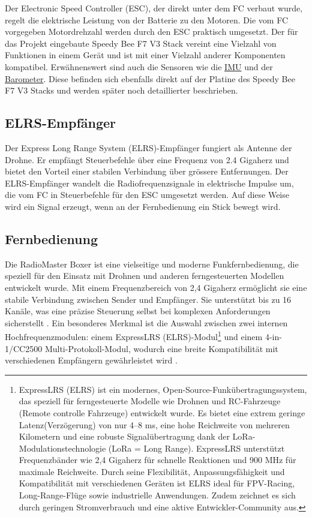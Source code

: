 Der Electronic Speed Controller (ESC), der direkt unter dem FC verbaut wurde, regelt die elektrische Leistung von der Batterie zu den Motoren. Die vom FC vorgegeben Motordrehzahl werden durch den ESC praktisch umgesetzt. Der für das Projekt eingebaute Speedy Bee F7 V3 Stack vereint eine Vielzahl von Funktionen in einem Gerät und ist mit einer Vielzahl anderer Komponenten kompatibel. Erwähnenswert sind auch die Sensoren wie die \hyperref[sec:IMU]{IMU} und der \hyperref[sec:Barometer]{Barometer}. Diese befinden sich ebenfalls direkt auf der Platine des Speedy Bee F7 V3 Stacks und werden später noch detaillierter beschrieben.

\subsection{ELRS-Empfänger} \label{sec:ELRS-Empfänger}
Der Express Long Range System (ELRS)-Empfänger \cite{ELRS} fungiert als Antenne der Drohne. Er empfängt Steuerbefehle über eine Frequenz von 2.4 Gigaherz und bietet den Vorteil einer stabilen Verbindung über grössere Entfernungen. Der ELRS-Empfänger wandelt die Radiofrequenzsignale in elektrische Impulse um, die vom FC in Steuerbefehle für den ESC umgesetzt werden. Auf diese Weise wird ein Signal erzeugt, wenn an der Fernbedienung ein Stick bewegt wird.

\subsection{Fernbedienung}  
Die RadioMaster Boxer ist eine vielseitige und moderne Funkfernbedienung, die speziell für den Einsatz mit Drohnen und anderen ferngesteuerten Modellen entwickelt wurde. Mit einem Frequenzbereich von 2,4 Gigaherz ermöglicht sie eine stabile Verbindung zwischen Sender und Empfänger\cite{RadioController}. Sie unterstützt bis zu 16 Kanäle, was eine präzise Steuerung selbst bei komplexen Anforderungen sicherstellt \cite{RadioController}. Ein besonderes Merkmal ist die Auswahl zwischen zwei internen Hochfrequenzmodulen: einem ExpressLRS (ELRS)-Modul\footnote{ExpressLRS (ELRS) ist ein modernes, Open-Source-Funkübertragungssystem, das speziell für ferngesteuerte Modelle wie Drohnen und RC-Fahrzeuge (Remote controlle Fahrzeuge) entwickelt wurde. Es bietet eine extrem geringe Latenz(Verzögerung) von nur 4–8 ms, eine hohe Reichweite von mehreren Kilometern und eine robuste Signalübertragung dank der LoRa-Modulationstechnologie (LoRa = Long Range). ExpressLRS unterstützt Frequenzbänder wie 2,4 Gigaherz für schnelle Reaktionen und 900 MHz für maximale Reichweite. Durch seine Flexibilität, Anpassungsfähigkeit und Kompatibilität mit verschiedenen Geräten ist ELRS ideal für FPV-Racing, Long-Range-Flüge sowie industrielle Anwendungen. Zudem zeichnet es sich durch geringen Stromverbrauch und eine aktive Entwickler-Community aus.} und einem 4-in-1/CC2500 Multi-Protokoll-Modul, wodurch eine breite Kompatibilität mit verschiedenen Empfängern gewährleistet wird \cite{ATOMRC}.

